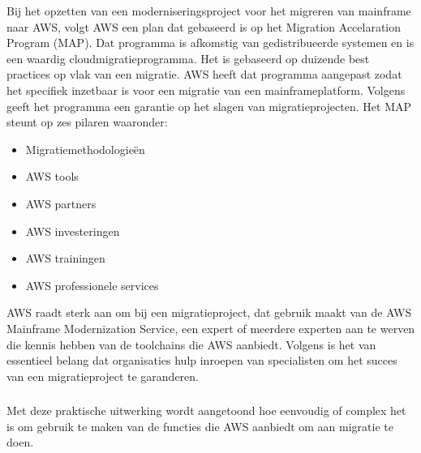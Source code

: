 Bij het opzetten van een moderniseringsproject voor het migreren van mainframe naar AWS, volgt AWS een plan dat gebaseerd is op het Migration Accelaration Program (MAP). Dat programma is afkomstig van gedistribueerde systemen en is een waardig cloudmigratieprogramma. Het is gebaseerd op duizende best practices op vlak van een migratie. AWS heeft dat programma aangepast zodat het specifiek inzetbaar is voor een migratie van een mainframeplatform. Volgens \textcite{Valence2021} geeft het programma een garantie op het slagen van migratieprojecten. Het MAP steunt op zes pilaren waaronder:
 \begin{itemize}
    \item Migratiemethodologieën
    \item AWS tools
    \item AWS partners
    \item AWS investeringen
    \item AWS trainingen
    \item AWS professionele services
\end{itemize}

AWS raadt sterk aan om bij een migratieproject, dat gebruik maakt van de AWS Mainframe Modernization Service, een expert of meerdere experten aan te werven die kennis hebben van de toolchains die AWS aanbiedt. Volgens \textcite{Valence2021} is het van essentieel belang dat organisaties hulp inroepen van specialisten om het succes van een migratieproject te garanderen. 

\subsubsection{}
\label{sec: Een praktische uitwerking: uitvoeren  van COBOL applicatie op AWS Lambda}

Met deze praktische uitwerking wordt aangetoond hoe eenvoudig of complex het is om  gebruik te maken van de functies die AWS aanbiedt om aan migratie te doen.

